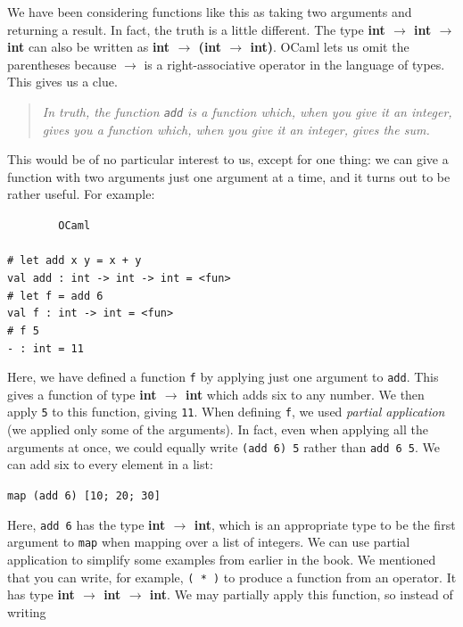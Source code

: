 \documentclass[]{book}
\newcommand{\smspace}{\vspace{4mm}}
\begin{document}
\noindent We have been considering functions like this as taking two arguments and returning a result. In fact, the truth is a little different. The type \textbf{\textsf{int $\rightarrow$ int $\rightarrow$ int}} can also be written as \textbf{\textsf{int $\rightarrow$ \textmd{(}int $\rightarrow$ int\textmd{)}}}. OCaml lets us omit the parentheses because \textbf{\textsf{$\rightarrow$}} is a right-associative operator in the language of types. This gives us a clue.

\begin{quote}
\textit{In truth, the function \texttt{add} is a function which, when you give it an integer, gives you a function which, when you give it an integer, gives the sum.}
\end{quote}

\noindent This would be of no particular interest to us, except for one thing: we can give a function with two arguments just one argument at a time, and it turns out to be rather useful. For example:

\smspace
\noindent\verb!        OCaml!\\
\noindent\\
\noindent\verb!# let add x y = x + y!\\
\noindent\texttt{val add :\ int -> int -> int = <fun>}\\
\noindent\verb!# let f = add 6!\\
\noindent\verb!val f : int -> int = <fun>!\\
\noindent\verb!# f 5!\\
\noindent\verb!- : int = 11!
\smspace

\noindent Here, we have defined a function \texttt{f} by applying just one argument to \texttt{add}. This gives a function of type \textbf{\textsf{int $\rightarrow$ int}} which adds six to any number. We then apply \texttt{5} to this function, giving \texttt{11}. When defining \texttt{f}, we used \textit{partial application} (we applied only some of the arguments).  In fact, even when applying all the arguments at once, we could equally write \texttt{(add 6) 5} rather than \texttt{add 6 5}. We can add six to every element in a list:

\smspace
\texttt{map (add 6) [10; 20; 30]}
\smspace

\noindent Here, \texttt{add 6} has the type \textsf{\textbf{int $\rightarrow$ int}}, which is an appropriate type to be the first argument to \texttt{map} when mapping over a list of integers. We can use partial application to simplify some examples from earlier in the book. We mentioned that you can write, for example, \texttt{( * )} to produce a function from an operator. It has type \textbf{\textsf{int $\rightarrow$ int $\rightarrow$ int}}. We may partially apply this function, so instead of writing
\end{document}
